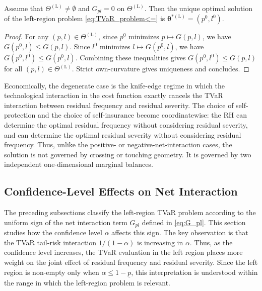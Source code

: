 \documentclass[a4paper,12pt]{article}
\begin{document}
\begin{proposition}\label{prop:tvar_degenerate}
Assume that $\Theta^{\left(\text{L}\right)}\neq\emptyset$ and $G_{pl}=0$ on $\Theta^{\left(\text{L}\right)}$. Then the unique optimal solution of the left-region problem \eqref{eq:TVaR_problem<=} is ${\bm\theta}^{*\left(\text{L}\right)}=\left(p^0,l^0\right)$.
\end{proposition}

\begin{proof}
For any $\left(p,l\right)\in\Theta^{\left(\text{L}\right)}$, since $p^0$ minimizes $p\mapsto G\left(p,l\right)$, we have $G\left(p^0,l\right)\leq G\left(p,l\right)$. Since $l^0$ minimizes $l\mapsto G\left(p^0,l\right)$, we have $G\left(p^0,l^0\right)\leq G\left(p^0,l\right)$. Combining these inequalities gives $G\left(p^0,l^0\right)\leq G\left(p,l\right)$ for all $\left(p,l\right)\in\Theta^{\left(\text{L}\right)}$. Strict own-curvature gives uniqueness and concludes.
\end{proof}

Economically, the degenerate case is the knife-edge regime in which the technological interaction in the cost function exactly cancels the TVaR interaction between residual frequency and residual severity. The choice of self-protection and the choice of self-insurance become coordinatewise: the RH can determine the optimal residual frequency without considering residual severity, and can determine the optimal residual severity without considering residual frequency. Thus, unlike the positive- or negative-net-interaction cases, the solution is not governed by crossing or touching geometry. It is governed by two independent one-dimensional marginal balances.

\subsection{Confidence-Level Effects on Net Interaction}\label{sec:confidence_net_interaction}

The preceding subsections classify the left-region TVaR problem according to the uniform sign of the net interaction term $G_{pl}$ defined in \eqref{eq:G_pl}. This section studies how the confidence level $\alpha$ affects this sign. The key observation is that the TVaR tail-risk interaction $1/\left(1-\alpha\right)$ is increasing in $\alpha$. Thus, as the confidence level increases, the TVaR evaluation in the left region places more weight on the joint effect of residual frequency and residual severity. Since the left region is non-empty only when $\alpha\leq 1-\underline{p}$, this interpretation is understood within the range in which the left-region problem is relevant.
\end{document}
